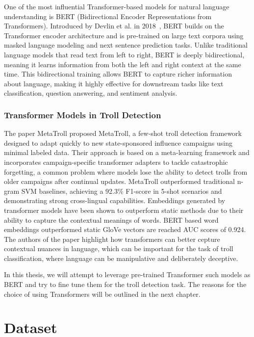\documentclass[twoside]{ctuthesis}
\theoremstyle{plain}
\theoremstyle{definition}
\theoremstyle{note}
\begin{document}
One of the most influential Transformer-based models for natural language understanding is BERT (Bidirectional Encoder Representations from Transformers). Introduced by Devlin et al. in 2018~\cite{Devlin2018}, BERT builds on the Transformer encoder architecture and is pre-trained on large text corpora using masked language modeling and next sentence prediction tasks. Unlike traditional language models that read text from left to right, BERT is deeply bidirectional, meaning it learns information from both the left and right context at the same time. This bidirectional training allows BERT to capture richer information about language, making it highly effective for downstream tasks like text classification, question answering, and sentiment analysis.

\subsection{Transformer Models in Troll Detection}
The paper MetaTroll proposed MetaTroll, a few-shot troll detection framework designed to adapt quickly to new state-sponsored influence campaigns using minimal labeled data. Their approach is based on a meta-learning framework and incorporates campaign-specific transformer adapters to tackle catastrophic forgetting, a common problem where models lose the ability to detect trolls from older campaigns after continual updates. MetaTroll outperformed traditional n-gram SVM baselines, achieving a 92.3\% F1-score in 5-shot scenarios and demonstrating strong cross-lingual capabilities.\cite{Tian2023}
Embeddings generated by transformer models have been shown to outperform static methods due to their ability to capture the contextual meanings of words. BERT based word embeddings outperformed static GloVe vectors are reached AUC scores of 0.924. The authors of the paper \cite{yilmaz2023} highlight how transformers can better cepture contextual nuances in language, which can be important for the task of troll classification, where language can be manipulative and deliberately deceptive.

In this thesis, we will attempt to leverage pre-trained Transformer such models as BERT and try to fine tune them for the troll detection task. The reasons for the choice of using Transformers will be outlined in the next chapter.\par

\chapter{Dataset}
\end{document}
